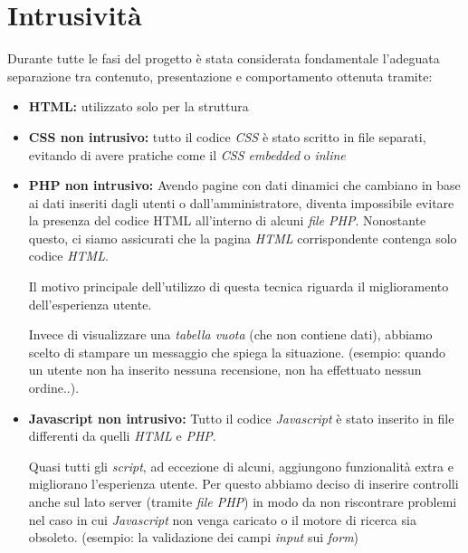 \section{Intrusività}
Durante tutte le fasi del progetto è stata considerata fondamentale l’adeguata separazione tra contenuto, presentazione e comportamento ottenuta tramite:
\begin{itemize}
	\item \textbf{HTML:} utilizzato solo per la struttura
	\item \textbf{CSS non intrusivo:} tutto il codice \textit{CSS} è stato scritto in file separati, evitando di avere pratiche come il \textit{CSS embedded} o \textit{inline}
	\item \textbf{PHP non intrusivo:} Avendo pagine con dati dinamici che cambiano in base ai dati inseriti dagli utenti o dall'amministratore, diventa impossibile evitare la presenza del codice HTML all’interno di alcuni \textit{file PHP}. Nonostante questo, ci siamo assicurati che la pagina \textit{HTML} corrispondente contenga solo codice \textit{HTML}.
	
		Il motivo principale dell’utilizzo di questa tecnica riguarda il miglioramento dell'esperienza utente.
		
		Invece di visualizzare una \textit{tabella vuota} (che non contiene dati), abbiamo scelto di stampare un messaggio che spiega la situazione. (esempio: quando un utente non ha inserito nessuna recensione, non ha effettuato nessun ordine..).
	\item \textbf{Javascript non intrusivo:} Tutto il codice \textit{Javascript} è stato inserito in file differenti da quelli \textit{HTML} e \textit{PHP}.
	
		Quasi tutti gli \textit{script}, ad eccezione di alcuni, aggiungono funzionalità extra e migliorano l’esperienza utente. Per questo abbiamo deciso di inserire controlli anche sul lato server (tramite \textit{file PHP}) in modo da non riscontrare problemi nel caso in cui \textit{Javascript} non venga caricato o il motore di ricerca sia obsoleto. (esempio: la validazione dei campi \textit{input} sui \textit{form})
\end{itemize}